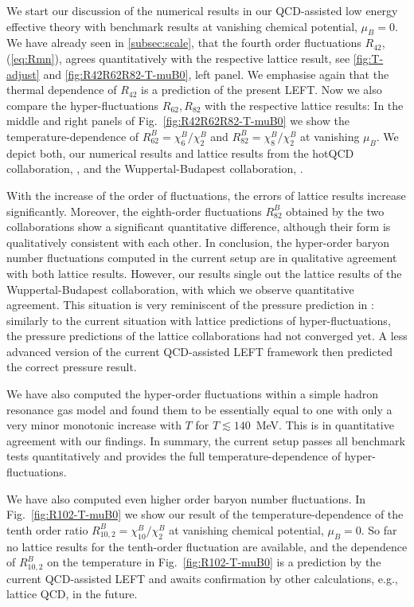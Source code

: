\documentclass[%
reprint,
superscriptaddress,
showpacs,preprintnumbers,
amsmath,amssymb,
aps,
prd,
]{revtex4-1}
\def\Fig#1{Fig.~\ref{#1}} \def\Tab#1{Tab.~\ref{#1}}
\def\eq#1{(\ref{#1})}
\begin{document}
	


We start our discussion of the numerical results in our QCD-assisted low energy effective theory with benchmark results at vanishing chemical potential, $\mu_B=0$. We have already seen in \autoref{subsec:scale}, that the fourth order fluctuations $R_{42}$, \eq{eq:Rmn}, agrees quantitatively with the respective lattice result, see \autoref{fig:T-adjust} and \autoref{fig:R42R62R82-T-muB0}, left panel. We emphasise again  that the thermal dependence of $R_{42}$ is a prediction of the present LEFT. Now we also compare the hyper-fluctuations $R_{62}, R_{82}$ with the respective lattice results: In the middle and right panels of \Fig{fig:R42R62R82-T-muB0} we show the temperature-dependence of $R^{B}_{62}=\chi^{B}_{6}/\chi^{B}_{2}$ and $R^{B}_{82}=\chi^{B}_{8}/\chi^{B}_{2}$ at vanishing $\mu_B$. We depict both, our numerical results and lattice results from the hotQCD collaboration, \cite{Bazavov:2017dus,Bazavov:2017tot,Bazavov:2020bjn}, and the Wuppertal-Budapest collaboration, \cite{Borsanyi:2018grb}. 

With the increase of the order of fluctuations, the errors of lattice results increase significantly. Moreover, the eighth-order fluctuations $R^{B}_{82}$ obtained by the two collaborations show a significant quantitative difference, although their form is qualitatively consistent with each other. In conclusion, the hyper-order baryon number fluctuations computed in the current setup are in qualitative agreement with both lattice results. However, our results single out the lattice results of the Wuppertal-Budapest collaboration, with which we observe quantitative agreement. This situation is very reminiscent of the pressure prediction in \cite{Herbst:2013ufa}: similarly to the current situation with lattice predictions of hyper-fluctuations, the pressure predictions of the lattice collaborations had not converged yet. A less advanced version of the current QCD-assisted LEFT framework then predicted the correct pressure result. 

We have also computed the hyper-order fluctuations within a simple hadron resonance gas model \cite{BraunMunzinger:2003zd} and found them to be essentially equal to one with only a very minor monotonic increase with $T$ for $T \lesssim 140$~MeV. This is in quantitative agreement with our findings. In summary, the current setup passes all benchmark tests quantitatively and provides the full temperature-dependence of hyper-fluctuations. 

We have also computed even higher order baryon number fluctuations. In \Fig{fig:R102-T-muB0} we show our result of the temperature-dependence of the tenth order ratio $R^{B}_{10,2}=\chi^{B}_{10}/\chi^{B}_{2}$ at vanishing chemical potential, $\mu_B=0$. So far no lattice results for the tenth-order fluctuation are available, and the dependence of $R^{B}_{10,2}$ on the temperature in \Fig{fig:R102-T-muB0} is  a prediction by the current QCD-assisted LEFT and awaits confirmation by other calculations, e.g., lattice QCD, in the future.
\end{document}

